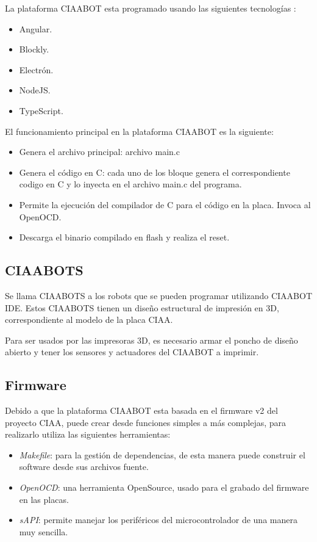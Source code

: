 La plataforma CIAABOT esta programado usando las siguientes tecnologías \citep{angular}\citep{blockly}\citep{electron}\citep{nodejs}\citep{typescript}:

\begin{itemize}
	\item Angular.
	\item Blockly.
	\item Electrón.
	\item NodeJS.
	\item TypeScript.
\end{itemize}

El funcionamiento principal en la plataforma CIAABOT es la siguiente:

\begin{itemize}
	\item Genera el archivo principal: archivo main.c
	\item Genera el código en C: cada uno de los bloque genera el correspondiente codigo en C y lo inyecta en el archivo main.c del programa.
	\item Permite la ejecución del compilador de C para el código en la placa.
	Invoca al OpenOCD.
	\item Descarga el binario compilado en flash y realiza el reset.
\end{itemize}

\subsection{CIAABOTS}
\label{subsec:CIAABOTS}

Se llama CIAABOTS a los robots que se pueden programar utilizando CIAABOT IDE. Estos CIAABOTS tienen un diseño estructural de impresión en 3D, correspondiente al modelo de la placa CIAA. 

Para ser usados por las impresoras 3D, es necesario armar el poncho de diseño abierto y tener los sensores y actuadores del CIAABOT a imprimir.

\subsection{Firmware}
\label{subsec:Firmware}

Debido a que la plataforma CIAABOT esta basada en el firmware v2 \citep{CIAA:firmwarev2} del proyecto CIAA, puede crear desde funciones simples a más complejas, para realizarlo
utiliza las siguientes herramientas:

\begin{itemize}
	\item \emph{Makefile}: para la gestión de dependencias, de esta manera puede construir
	el software desde sus archivos fuente.	
	\item \emph{OpenOCD}: una herramienta OpenSource, usado para el grabado del firmware
	en las placas.
	\item \emph{sAPI}\citep{sAPI}: permite manejar los periféricos del microcontrolador de una manera
	muy sencilla.
\end{itemize}


